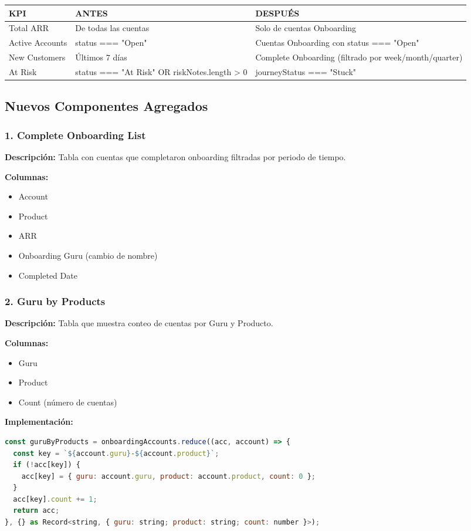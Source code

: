 \documentclass[12pt,a4paper]{article}
\begin{document}
\begin{longtable}{|p{5cm}|p{4cm}|p{5cm}|}
\hline
\textbf{KPI} & \textbf{ANTES} & \textbf{DESPUÉS} \\
\hline
\endhead
Total ARR & De todas las cuentas & Solo de cuentas Onboarding \\
\hline
Active Accounts & status === "Open" & Cuentas Onboarding con status === "Open" \\
\hline
New Customers & Últimos 7 días & Complete Onboarding (filtrado por week/month/quarter) \\
\hline
At Risk & status === "At Risk" OR riskNotes.length > 0 & journeyStatus === "Stuck" \\
\hline
\end{longtable}

\subsection{Nuevos Componentes Agregados}

\subsubsection{1. Complete Onboarding List}
\textbf{Descripción:} Tabla con cuentas que completaron onboarding filtradas por periodo de tiempo.

\textbf{Columnas:}
\begin{itemize}
    \item Account
    \item Product
    \item ARR
    \item Onboarding Guru (cambio de nombre)
    \item Completed Date
\end{itemize}

\subsubsection{2. Guru by Products}
\textbf{Descripción:} Tabla que muestra conteo de cuentas por Guru y Producto.

\textbf{Columnas:}
\begin{itemize}
    \item Guru
    \item Product
    \item Count (número de cuentas)
\end{itemize}

\textbf{Implementación:}
\begin{lstlisting}[language=JavaScript]
const guruByProducts = onboardingAccounts.reduce((acc, account) => {
  const key = `${account.guru}-${account.product}`;
  if (!acc[key]) {
    acc[key] = { guru: account.guru, product: account.product, count: 0 };
  }
  acc[key].count += 1;
  return acc;
}, {} as Record<string, { guru: string; product: string; count: number }>);
\end{lstlisting}
\end{document}
